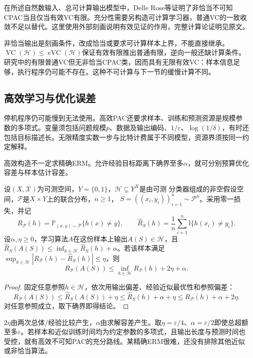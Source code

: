 在所述自然数输入、总可计算输出模型中，Delle Rose等证明了非恰当不可知CPAC当且仅当有效VC有限。充分性需要另构造可计算学习器，普通VC的一致收敛不足以替代。这里使用外部刻画说明有效见证的作用，完整计算论证明见原文。

非恰当输出是刻画条件，改成恰当或要求可计算样本上界，不能直接继承。$\operatorname{VC}(\mathcal H)\leq\operatorname{eVC}(\mathcal H)$保证有效有限推出普通有限，逆向一般还缺计算条件。研究中的有限普通VC但无非恰当CPAC类，因而具有无限有效VC：样本信息足够，执行程序仍可能不存在。这种不可计算与下一节的缓慢计算不同。

\subsection{高效学习与优化误差}

停机程序仍可能慢到无法使用。高效PAC还要求样本、训练和预测资源是规模参数的多项式。变量须包括问题规模$p$、数据及输出编码、$1/\varepsilon$、$\log(1/\delta)$，有时还包括目标描述长。无限精度实数一步与比特计费属于不同模型，资源界须按同一约定解释。

高效构造不一定求精确ERM。允许经验目标距离下确界至多$\alpha$，就可分别预算优化容差与样本估计容差。

\begin{theorem}[近似ERM的期望风险保证]
\label{thm:approximate-erm-risk}
设$(X,\mathcal X)$为可测空间，$Y=\{0,1\}$，$\mathcal H\subseteq Y^X$是由可测
分类器组成的非空假设空间，$\mathcal P$是$X\times Y$上的联合分布，$n\geq1$，
$S=((x_i,y_i))_{i=1}^n\sim\mathcal P^n$。采用零一损失，并记
\[
 R_{\mathcal P}(h)=\mathbb P_{(x,y)\sim\mathcal P}\{h(x)\neq y\},\qquad
 \hat R_S(h)=\frac1n\sum_{i=1}^n\mathbb I\{h(x_i)\neq y_i\}.
\]
设$\alpha,\eta\geq0$，学习算法$A$在这份样本上输出$A(S)\in\mathcal H$，且
$\hat R_S(A(S))\leq\inf_{h\in\mathcal H}\hat R_S(h)+\alpha$。若该样本满足
$\sup_{h\in\mathcal H}|R_{\mathcal P}(h)-\hat R_S(h)|\leq\eta$，则
\[
 R_{\mathcal P}(A(S))
 \leq\inf_{h\in\mathcal H}R_{\mathcal P}(h)+2\eta+\alpha.
\]
\end{theorem}

\begin{proof}
固定任意参照$h\in\mathcal H$，依次用输出偏差、经验近似最优性和参照偏差：
\[
 R_{\mathcal P}(A(S))
 \leq\hat R_S(A(S))+\eta
 \leq\hat R_S(h)+\alpha+\eta
 \leq R_{\mathcal P}(h)+\alpha+2\eta.
\]
对任意参照成立，取下确界即得结论。
\end{proof}

$2\eta$由两次总体/经验比较产生，$\alpha$由求解容差产生。取$\eta=\varepsilon/4$、$\alpha=\varepsilon/2$即使总超额至多$\varepsilon$。若样本和近似训练时间均为约定参数的多项式，且输出长度与预测时间也受控，就有高效不可知PAC的充分路线。某精确ERM很难，还没有排除其他近似或非恰当算法。

